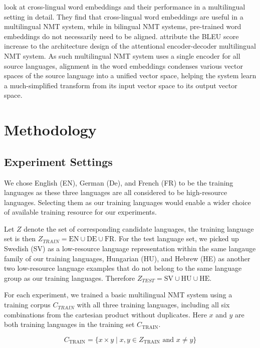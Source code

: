 \documentclass[thesis,fonts=libertine]{cluu}
\begin{document}
\textcite{Qi:2018aa} look at cross-lingual word embeddings and their performance in a multilingual setting in detail. They find that cross-lingual word embeddings are useful in a multilingual NMT system, while in bilingual NMT systems, pre-trained word embeddings do not necessarily need to be aligned. \textcite{Qi:2018aa} attribute the BLEU score increase to the architecture design of the attentional encoder-decoder multilingual NMT system. As such multilingual NMT system uses a single encoder for all source languages, alignment in the word embeddings condenses various vector spaces of the source language into a unified vector space, helping the system learn a much-simplified transform from its input vector space to its output vector space.

\chapter{Methodology}
\label{chap:method}

\section{Experiment Settings}
\label{sec:initial_exp_settings}

We chose English (EN), German (De), and French (FR) to be the training languages as these three languages are all considered to be high-resource languages. Selecting them as our training languages would enable a wider choice of available training resource for our experiments.

Let $Z$ denote the set of corresponding candidate languages, the training language set is then $Z_{TRAIN} = {\text{EN}\cup \text{DE}\cup \text{FR}}$. For the test language set, we picked up Swedish (SV) as a low-resource language representation within the same langauge family of our training languages, Hungarian (HU), and Hebrew (HE) as another two low-resource language examples that do not belong to the same language group as our training languages. Therefore $Z_{TEST} = {\text{SV}\cup \text{HU}\cup \text{HE}}$.

For each experiment, we trained a basic multilingual NMT system using a training corpus $C_{TRAIN}$ with all three training languages, including all six combinations from the cartesian product without duplicates. Here $x$ and $y$ are both training languages in the training set $C_{\text{TRAIN}}$.

\begin{equation*}
  C_{\text{TRAIN}} = \{x \times y \mid x, y \in Z_{\text{TRAIN}} \text{ and } x \neq y\}
\end{equation*}
\end{document}

